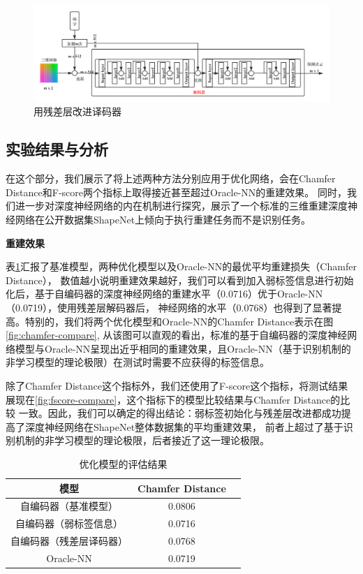 \documentclass[bachelor, nocolorlinks, printoneside]{seuthesis} %
\begin{document}
\begin{Main}
\begin{figure}
    \centering
    \includegraphics[width=0.99\columnwidth]{figs/model/resnet_decoder.png}
    \caption{用残差层改进译码器}
    \label{fig:resnet_decoder}
\end{figure}

\FloatBarrier



\subsection{实验结果与分析}
\label{sec:shapenet_result}
在这个部分，我们展示了将上述两种方法分别应用于优化网络，会在Chamfer Distance和F-score两个指标上取得接近甚至超过Oracle-NN的重建效果。
同时，我们进一步对深度神经网络的内在机制进行探究，展示了一个标准的三维重建深度神经网络在公开数据集ShapeNet上倾向于执行重建任务而不是识别任务。

\noindent
\textbf{重建效果}

表\ref{table:metric_optimal_baseline}汇报了基准模型，两种优化模型以及Oracle-NN的最优平均重建损失（Chamfer Distance），
数值越小说明重建效果越好，我们可以看到加入弱标签信息进行初始化后，基于自编码器的深度神经网络的重建水平（0.0716）优于Oracle-NN（0.0719），使用残差层解码器后，
神经网络的水平（0.0768）也得到了显著提高。特别的，我们将两个优化模型和Oracle-NN的Chamfer Distance表示在图\ref{fig:chamfer-compare},
从该图可以直观的看出，标准的基于自编码器的深度神经网络模型与Oracle-NN呈现出近乎相同的重建效果，且Oracle-NN（基于识别机制的非学习模型的理论极限）在测试时需要不应获得的标签信息。

除了Chamfer Distance这个指标外，我们还使用了F-score这个指标，将测试结果展现在\ref{fig:fscore-compare}，这个指标下的模型比较结果与Chamfer Distance的比较
一致。因此，我们可以确定的得出结论：弱标签初始化与残差层改进都成功提高了深度神经网络在ShapeNet整体数据集的平均重建效果，
前者上超过了基于识别机制的非学习模型的理论极限，后者接近了这一理论极限。

\begin{table}
    \centering
    \caption{优化模型的评估结果}
    \begin{tabular}{ccc} 
    \hline
    模型                      & Chamfer Distance \\
    \hline
    自编码器（基准模型）            & 0.0806     \\
    自编码器（弱标签信息）           & 0.0716                             \\
    自编码器（残差层译码器）         & 0.0768                         \\
    Oracle-NN & 0.0719                           \\
    \hline
    \end{tabular}
    \label{table:metric_optimal_baseline}
\end{table}


\end{Main}
\end{document}
